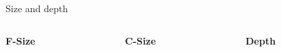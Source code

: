 \begin{frame}{Size and depth}
    \begin{columns}
        \begin{column}[t]{0.32\linewidth}
            \centering
            \textbf{F-Size}

            \vspace{0.2cm}

            \vspace{0.2cm}

            \vspace{0.2cm}
        \end{column}
        \begin{column}[t]{0.32\linewidth}
            \centering 
            \textbf{C-Size}

            \vspace{0.2cm}

            
            \vspace{0.2cm}

            \vspace{0.2cm}
        \end{column}
        \begin{column}[t]{0.32\linewidth}
            \centering
            \textbf{Depth}

            \vspace{0.2cm}

            \vspace{0.2cm}

            \vspace{0.2cm}
        \end{column}
    \end{columns}

    \vspace{0.35cm}
    \begin{center}
    \end{center}

\end{frame}


